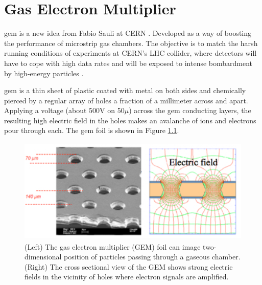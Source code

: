 \chapter{Gas Electron Multiplier}
{gem} is a new idea from Fabio Sauli at CERN \cite{paper:NIMPR:FSauli}. Developed as a way of boosting the performance of microstrip gas chambers. The objective is to match the harsh running conditions of experiments at CERN's LHC collider, where detectors will have to cope with high data rates and will be exposed to intense bombardment by high-energy particles \cite{article:cernCourier:gem}.

{gem} is a thin sheet of plastic coated with metal on both sides and chemically pierced by a regular array of holes a fraction of a millimeter across and apart. Applying a voltage (about 500V on 50$\mu$) across the {gem} conducting layers, the resulting high electric field in the holes makes an avalanche of ions and electrons pour through each. The {gem} foil is shown in Figure \ref{gem}.
\begin{figure}[htb]
	\begin{center}
		\includegraphics[width=12.0cm,height=5cm]{figures/GEM/KEKDTP3.jpg}
		\caption{(Left) The gas electron multiplier (GEM) foil can image two-dimensional position of particles passing through a gaseous chamber. (Right) The cross sectional view of the GEM shows strong electric fields in the vicinity of holes where electron signals are amplified.}
		\label{gem}
	\end{center}
\end{figure} 

